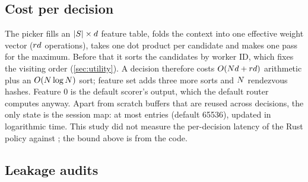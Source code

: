 \subsection{Cost per decision}

The picker fills an $|S| \times d$ feature table, folds the context into one effective
weight vector ($rd$ operations), takes one dot product per candidate and makes one pass
for the maximum. Before that it sorts the candidates by worker ID, which fixes the visiting order
(\cref{sec:utility}). A decision therefore costs $O(Nd + rd)$ arithmetic plus an
$O(N\log N)$ sort; feature set  adds three more sorts and $N$ rendezvous hashes.
Feature 0 is the default scorer's output, which the default router computes anyway. Apart from
scratch buffers that are reused across decisions, the only state is the session map: at most
 entries (default \num{65536}), updated in logarithmic time. This study did
not measure the per-decision latency of the Rust policy against ; the bound above is
from the code.

\subsection{Leakage audits}

